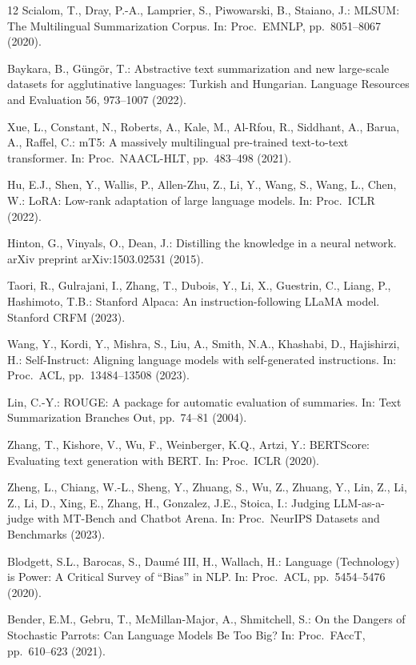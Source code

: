 \documentclass{llncs}
\begin{document}
\begin{thebibliography}{12}
Scialom, T., Dray, P.-A., Lamprier, S., Piwowarski, B., Staiano, J.: MLSUM: The Multilingual Summarization Corpus. In: Proc.\ EMNLP, pp.\ 8051--8067 (2020).

Baykara, B., Güngör, T.: Abstractive text summarization and new large-scale datasets for agglutinative languages: Turkish and Hungarian. Language Resources and Evaluation 56, 973--1007 (2022).

Xue, L., Constant, N., Roberts, A., Kale, M., Al-Rfou, R., Siddhant, A., Barua, A., Raffel, C.: mT5: A massively multilingual pre-trained text-to-text transformer. In: Proc.\ NAACL-HLT, pp.\ 483--498 (2021).

Hu, E.J., Shen, Y., Wallis, P., Allen-Zhu, Z., Li, Y., Wang, S., Wang, L., Chen, W.: LoRA: Low-rank adaptation of large language models. In: Proc.\ ICLR (2022).

Hinton, G., Vinyals, O., Dean, J.: Distilling the knowledge in a neural network. arXiv preprint arXiv:1503.02531 (2015).

Taori, R., Gulrajani, I., Zhang, T., Dubois, Y., Li, X., Guestrin, C., Liang, P., Hashimoto, T.B.: Stanford Alpaca: An instruction-following LLaMA model. Stanford CRFM (2023).

Wang, Y., Kordi, Y., Mishra, S., Liu, A., Smith, N.A., Khashabi, D., Hajishirzi, H.: Self-Instruct: Aligning language models with self-generated instructions. In: Proc.\ ACL, pp.\ 13484--13508 (2023).

Lin, C.-Y.: ROUGE: A package for automatic evaluation of summaries. In: Text Summarization Branches Out, pp.\ 74--81 (2004).

Zhang, T., Kishore, V., Wu, F., Weinberger, K.Q., Artzi, Y.: BERTScore: Evaluating text generation with BERT. In: Proc.\ ICLR (2020).

Zheng, L., Chiang, W.-L., Sheng, Y., Zhuang, S., Wu, Z., Zhuang, Y., Lin, Z., Li, Z., Li, D., Xing, E., Zhang, H., Gonzalez, J.E., Stoica, I.: Judging LLM-as-a-judge with MT-Bench and Chatbot Arena. In: Proc.\ NeurIPS Datasets and Benchmarks (2023).

Blodgett, S.L., Barocas, S., Daumé III, H., Wallach, H.: Language (Technology) is Power: A Critical Survey of ``Bias'' in NLP. In: Proc.\ ACL, pp.\ 5454--5476 (2020).

Bender, E.M., Gebru, T., McMillan-Major, A., Shmitchell, S.: On the Dangers of Stochastic Parrots: Can Language Models Be Too Big? In: Proc.\ FAccT, pp.\ 610--623 (2021).
\end{thebibliography}
\end{document}
